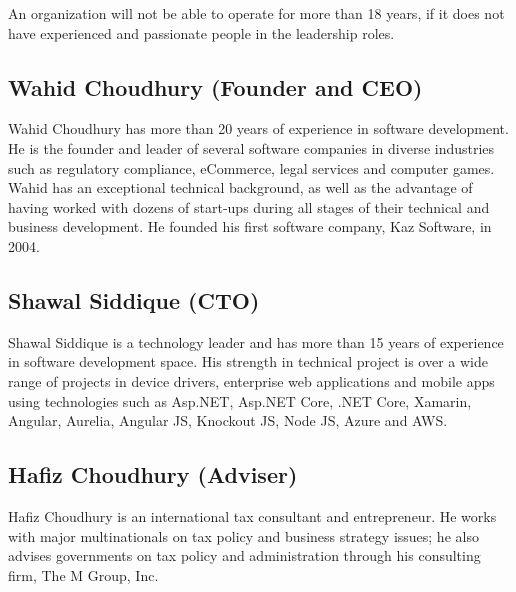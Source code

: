 An organization will not be able to operate for more than 18 years, if it does not have experienced and passionate people in the leadership roles.

\subsection[Founder and CEO]{Wahid Choudhury (Founder and CEO)}

Wahid Choudhury has more than 20 years of experience in software development.
He is the founder and leader of several software companies in diverse industries such as regulatory compliance, eCommerce, legal services and computer games. 
Wahid has an exceptional technical background, as well as the advantage of having worked with dozens of start-ups during all stages of their technical and business development. He founded his first software company, Kaz Software, in 2004.

\subsection[CTO]{Shawal Siddique (CTO)}

Shawal Siddique is a technology leader and has more than 15 years of experience in software development space.
His strength in technical project is over a wide range of projects in device drivers, enterprise web applications and mobile apps using technologies such as Asp.NET, Asp.NET Core, .NET Core, Xamarin, Angular, Aurelia, Angular JS, Knockout JS, Node JS, Azure and AWS.

\subsection[Adviser]{Hafiz Choudhury (Adviser)}

Hafiz Choudhury is an international tax consultant and entrepreneur.
He works with major multinationals on tax policy and business strategy issues; he also advises governments on tax policy and administration through his consulting firm, The M Group, Inc.

